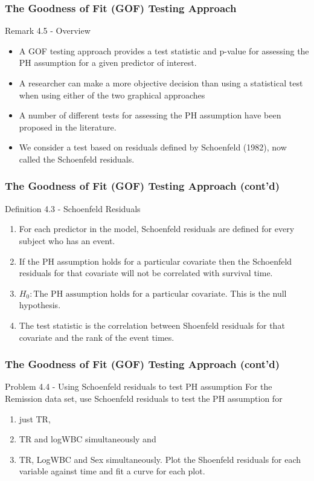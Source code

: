 \documentclass{beamer}
\theoremstyle{definition}
\begin{document}
\begin{frame}
\frametitle{The Goodness of Fit (GOF) Testing Approach}
\begin{block}{Remark 4.5 - Overview}
\begin{itemize}
\item A GOF testing approach provides a test statistic and p-value for
assessing the PH assumption for a given predictor of interest.
\item A researcher can make a more objective decision than using a statistical test when using either of
the two graphical approaches
\item A number of different tests for assessing the PH
assumption have been proposed in the literature.
\item We consider a test  based on residuals
defined by Schoenfeld (1982), now called the Schoenfeld
residuals.
\end{itemize}
\end{block}
\end{frame}

\begin{frame}
\frametitle{The Goodness of Fit (GOF) Testing Approach (cont'd)}
\begin{block}{Definition 4.3 - Schoenfeld Residuals}
\begin{enumerate}
\item For each predictor in the model, Schoenfeld
residuals are defined for every subject who
has an event.
\item If the PH assumption holds for a particular covariate
then the Schoenfeld residuals for that
covariate will not be correlated with survival time.
\item $H_0: \text{The PH assumption holds for a particular covariate}$. This is the null hypothesis.
\item The test statistic is the correlation between Shoenfeld residuals for that covariate and the rank of the event times.
\end{enumerate}
\end{block}
\end{frame}

\begin{frame}
\frametitle{The Goodness of Fit (GOF) Testing Approach (cont'd)}
\begin{block}{Problem 4.4 - Using Schoenfeld residuals to test PH assumption}
For the Remission data set, use Schoenfeld residuals to test the PH assumption for
\begin{enumerate}
\item just TR,
\item TR and logWBC simultaneously and
\item TR, LogWBC and Sex simultaneously. Plot the Shoenfeld residuals for each variable against time and fit a curve for each plot.
\end{enumerate}
\end{block}
\end{frame}
\end{document}
